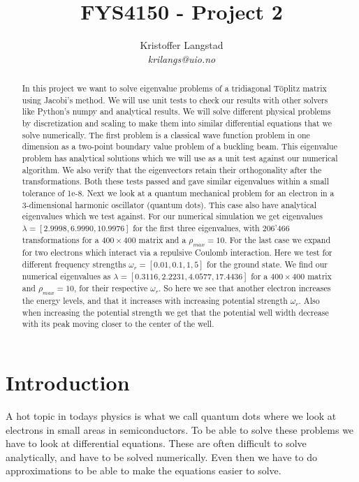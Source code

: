 \documentclass[12pt,a4paper,english]{article}
\title{FYS4150 - Project 2}
\date{}
\author{ Kristoffer Langstad\\ \textit{krilangs@uio.no}}
\begin{document}
\maketitle
\begin{abstract}
In this project we want to solve eigenvalue problems of a tridiagonal Töplitz matrix using Jacobi's method. We will use unit tests to check our results with other solvers like Python's numpy and analytical results. We will solve different physical problems by discretization and scaling to make them into similar differential equations that we solve numerically. The first problem is a classical wave function problem in one dimension as a two-point boundary value problem of a buckling beam. This eigenvalue problem has analytical solutions which we will use as a unit test against our numerical algorithm. We also verify that the eigenvectors retain their orthogonality after the transformations. Both these tests passed and gave similar eigenvalues within a small tolerance of 1e-8. Next we look at a quantum mechanical problem for an electron in a 3-dimensional harmonic oscillator (quantum dots). This case also have analytical eigenvalues which we test against. For our numerical simulation we get eigenvalues $\lambda=[2.9998, 6.9990, 10.9976]$ for the first three eigenvalues, with 206'466 transformations for a $400\times400$ matrix and a $\rho_{max}=10$. For the last case we expand for two electrons which interact via a repulsive Coulomb interaction. Here we test for different frequency strengths $\omega_r=[0.01, 0.1, 1, 5]$ for the ground state. We find our numerical eigenvalues as $\lambda=[0.3116,2.2231, 4.0577,17.4436]$ for a $400\times400$ matrix and $\rho_{max}=10$, for their respective $\omega_r$. So here we see that another electron increases the energy levels, and that it increases with increasing potential strength $\omega_r$. Also when increasing the potential strength we get that the potential well width decrease with its peak moving closer to the center of the well.
\end{abstract}

\section{Introduction}
A hot topic in todays physics is what we call quantum dots where we look at electrons in small areas in semiconductors. To be able to solve these problems we have to look at differential equations. These are often difficult to solve analytically, and have to be solved numerically. Even then we have to do approximations to be able to make the equations easier to solve.
\end{document}
